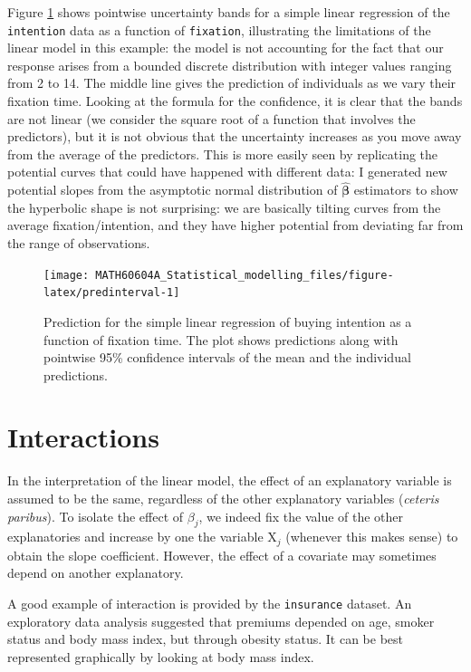 \documentclass[
  11pt,
  letterpaper,
]{book}
\theoremstyle{definition}
\theoremstyle{definition}
\theoremstyle{definition}
\theoremstyle{definition}
\theoremstyle{remark}
\begin{document}
Figure \ref{fig:predinterval} shows pointwise uncertainty bands for a simple linear regression of the \texttt{intention} data as a function of \texttt{fixation}, illustrating the limitations of the linear model in this example: the model is not accounting for the fact that our response arises from a bounded discrete distribution with integer values ranging from 2 to 14. The middle line gives the prediction of individuals as we vary their fixation time. Looking at the formula for the confidence, it is clear that the bands are not linear (we consider the square root of a function that involves the predictors), but it is not obvious that the uncertainty increases as you move away from the average of the predictors. This is more easily seen by replicating the potential curves that could have happened with different data: I generated new potential slopes from the asymptotic normal distribution of \(\widehat{\boldsymbol{\beta}}\) estimators to show the hyperbolic shape is not surprising: we are basically tilting curves from the average fixation/intention, and they have higher potential from deviating far from the range of observations.

\begin{figure}

{\centering \texttt{[image: MATH60604A\_Statistical\_modelling\_files/figure-latex/predinterval-1]} 

}

\caption{Prediction for the simple linear regression of buying intention as a function of fixation time. The plot shows predictions along with pointwise 95\% confidence intervals of the mean and the individual predictions.}\label{fig:predinterval}
\end{figure}

\hypertarget{interactions}{%
\section{Interactions}\label{interactions}}

In the interpretation of the linear model, the effect of an explanatory variable is assumed to be the same, regardless of the other explanatory variables (\emph{ceteris paribus}). To isolate the effect of \(\beta_j\), we indeed fix the value of the other explanatories and increase by one the variable \(\mathrm{X}_j\) (whenever this makes sense) to obtain the slope coefficient. However, the effect of a covariate may sometimes depend on another explanatory.

A good example of interaction is provided by the \texttt{insurance} dataset. An exploratory data analysis suggested that premiums depended on age, smoker status and body mass index, but through obesity status. It can be best represented graphically by looking at body mass index.
\end{document}
